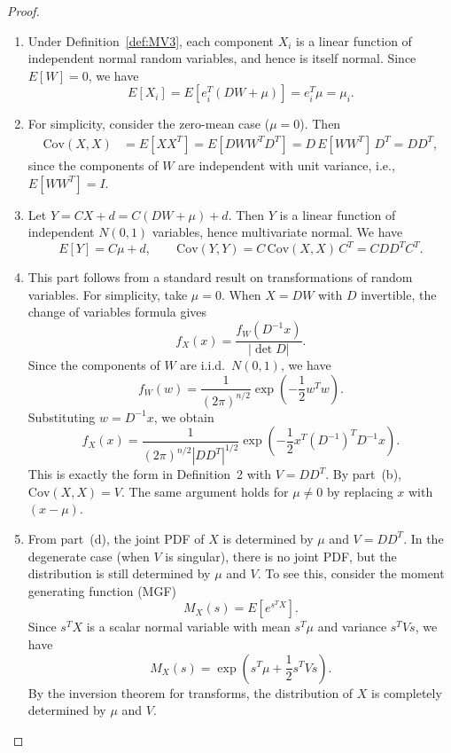 \documentclass{article}
\begin{document}
\begin{proof}
\begin{enumerate}
\item 
Under Definition~\ref{def:MV3}, each component $X_i$ is a linear function of independent normal random variables, and hence is itself normal.  
Since $E[W] = 0$, we have
\[
E[X_i] = E[e_i^T(DW + \mu)] = e_i^T \mu = \mu_i.
\]

\item 
For simplicity, consider the zero-mean case ($\mu = 0$).  
Then
\begin{align*}
\mathrm{Cov}(X, X) 
&= E[XX^T] 
= E[DWW^T D^T] 
= D\,E[WW^T]\,D^T 
= D D^T,
\end{align*}
since the components of $W$ are independent with unit variance, i.e., $E[WW^T] = I$.

\item 
Let $Y = C X + d = C(DW + \mu) + d$.  
Then $Y$ is a linear function of independent $N(0,1)$ variables, hence multivariate normal.  
We have
\[
E[Y] = C \mu + d, \qquad 
\mathrm{Cov}(Y, Y) = C\,\mathrm{Cov}(X, X)\,C^T = C D D^T C^T.
\]

\item 
This part follows from a standard result on transformations of random variables.  
For simplicity, take $\mu = 0$.  
When $X = D W$ with $D$ invertible, the change of variables formula gives
\[
f_X(x) = \frac{f_W(D^{-1}x)}{|\det D|}.
\]
Since the components of $W$ are i.i.d.\ $N(0,1)$, we have
\[
f_W(w) = \frac{1}{(2\pi)^{n/2}} 
\exp\!\left(-\frac{1}{2} w^T w \right).
\]
Substituting $w = D^{-1}x$, we obtain
\[
f_X(x) = \frac{1}{(2\pi)^{n/2} |D D^T|^{1/2}}
\exp\!\left(-\frac{1}{2} x^T (D^{-1})^T D^{-1} x \right).
\]
This is exactly the form in Definition~2 with $V = D D^T$.  
By part~(b), $\mathrm{Cov}(X, X) = V$.  
The same argument holds for $\mu \ne 0$ by replacing $x$ with $(x - \mu)$.

\item 
From part~(d), the joint PDF of $X$ is determined by $\mu$ and $V = D D^T$.
In the degenerate case (when $V$ is singular), there is no joint PDF, but the distribution is still determined by $\mu$ and $V$.
To see this, consider the moment generating function (MGF)
\[
M_X(s) = E[e^{s^T X}].
\]
Since $s^T X$ is a scalar normal variable with mean $s^T \mu$ and variance $s^T V s$, we have
\[
M_X(s) = \exp\!\left(s^T \mu + \frac{1}{2} s^T V s\right).
\]
By the inversion theorem for transforms, the distribution of $X$ is completely determined by $\mu$ and $V$.


\end{enumerate}
\end{proof}
\end{document}
